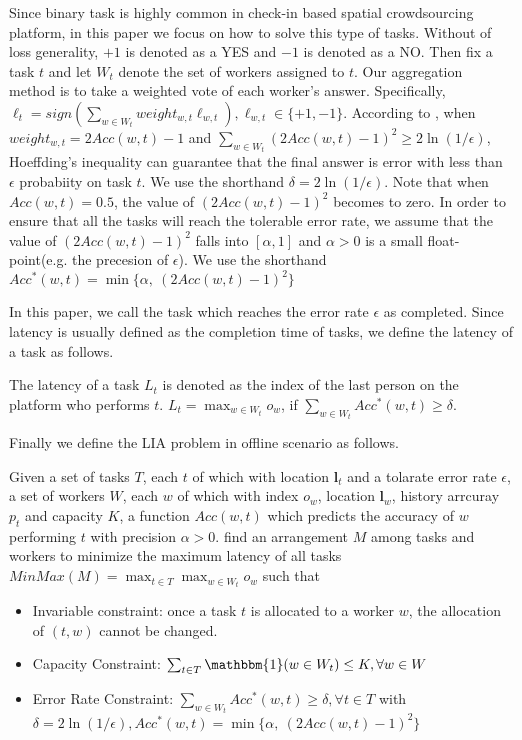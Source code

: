 Since binary task is highly common in check-in based spatial crowdsourcing platform, in this paper
we focus on how to solve this type of tasks. 
Without of loss generality, $+1$ is denoted as a YES and $-1$ is denoted as a NO.
Then fix a task $t$ and let $W_{t}$ denote the set of workers assigned to $t$.
Our aggregation method is to take a weighted vote of each worker's answer.
Specifically, $\ell_t = sign(\sum_{w \in W_{t}}{weight_{w,t} \ell_{w,t}}), \ell_{w,t} \in \{+1, -1\}$.
According to \cite{Ho2013}, 
when $weight_{w,t} = 2Acc(w,t) - 1$ and $\sum_{w \in W_t}(2Acc(w,t) - 1)^2 \ge 2\ln(1/\epsilon)$,
Hoeffding’s inequality can guarantee that the final answer is error with less than $\epsilon$ probabiity on task $t$.
We use the shorthand $\delta = 2\ln(1/\epsilon)$. 
Note that when $Acc(w,t) = 0.5$, the value of $(2Acc(w,t) - 1)^2$ becomes to zero.
In order to ensure that all the tasks will reach the tolerable error rate, 
we assume that the value of $(2Acc(w,t) - 1)^2$ falls into $[\alpha, 1]$ and $\alpha > 0$ is a small float-point(e.g. the precesion of $\epsilon$).
We use the shorthand $Acc^{*}(w,t) = \min\{\alpha,\ (2Acc(w,t) - 1)^2\}$ 

In this paper, we call the task which reaches the error rate $\epsilon$ as completed.
Since latency is usually defined as the completion time of tasks, 
we define the latency of a task as follows.
\begin{definition}
\label{def:taskLatency}
The latency of a task $L_t$ is denoted as the index of the last person on the platform who performs $t$.
$L_t = \max_{w \in W_t} o_w$,
if $\sum_{w \in W_t} Acc^{*}(w,t) \ge \delta$.
\end{definition}

Finally we define the LIA problem in offline scenario as follows.
\begin{definition}
Given a set of tasks $T$, each $t$ of which with location $\boldsymbol{l}_t$ and a tolarate error rate $\epsilon$,
a set of workers $W$, each $w$ of which with index $o_w$, location $\boldsymbol{l}_w$, history arrcuray $p_t$ and capacity $K$,
a function $Acc(w, t)$ which predicts the accuracy of $w$ performing $t$ with precision $\alpha > 0$.
find an arrangement $M$ among tasks and workers to minimize the maximum latency of all tasks
$MinMax(M) = \max_{t \in T}{\max_{w \in W_t} o_w}$ such that
\begin{itemize}
\vspace{-1ex}
\item Invariable constraint: once a task $t$ is allocated to a worker $w$, the allocation of $(t, w)$ cannot be changed.
\vspace{-1ex}
\item Capacity Constraint: $\sum_{t \in T} \mathbbm{1}(w \in W_t) \le K, \forall w \in W$
\vspace{-1ex}
\item Error Rate Constraint: $\sum_{w \in W_t} Acc^{*}(w,t) \ge \delta, \forall t \in T$ with $\delta = 2\ln(1/\epsilon), Acc^{*}(w,t) = \min\{\alpha,\ (2Acc(w,t) - 1)^2\}$
\end{itemize}
\end{definition}

